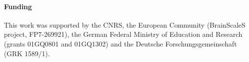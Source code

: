 \documentclass{frontiers}
\begin{document}
\paragraph{Funding\textcolon} This work was supported by the CNRS, the European Community (BrainScaleS project, FP7-269921), the German Federal Ministry of Education and Research (grants 01GQ0801 and 01GQ1302) and the Deutsche Forschungsgemeinschaft (GRK 1589/1).


\end{document}

